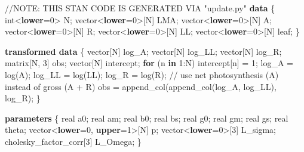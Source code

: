 \documentclass[
  12pt,
  letterpaper,
  DIV=11,
  numbers=noendperiod]{scrartcl}
\newenvironment{Shaded}{\begin{snugshade}}{\end{snugshade}}
\newcommand{\AlertTok}[1]{\textcolor[rgb]{0.68,0.00,0.00}{#1}}
\newcommand{\CommentTok}[1]{\textcolor[rgb]{0.37,0.37,0.37}{#1}}
\newcommand{\ControlFlowTok}[1]{\textcolor[rgb]{0.00,0.23,0.31}{\textbf{#1}}}
\newcommand{\DataTypeTok}[1]{\textcolor[rgb]{0.68,0.00,0.00}{#1}}
\newcommand{\DecValTok}[1]{\textcolor[rgb]{0.68,0.00,0.00}{#1}}
\newcommand{\KeywordTok}[1]{\textcolor[rgb]{0.00,0.23,0.31}{\textbf{#1}}}
\newcommand{\NormalTok}[1]{\textcolor[rgb]{0.00,0.23,0.31}{#1}}
\numberwithin{equation}{section} %
\begin{document}
\begin{Shaded}
\begin{Highlighting}[]
\CommentTok{//}\AlertTok{NOTE}\CommentTok{: THIS STAN CODE IS GENERATED VIA "update.py"}
\KeywordTok{data}\NormalTok{ \{}
  \DataTypeTok{int}\NormalTok{\textless{}}\KeywordTok{lower}\NormalTok{=}\DecValTok{0}\NormalTok{\textgreater{} N;}
  \DataTypeTok{vector}\NormalTok{\textless{}}\KeywordTok{lower}\NormalTok{=}\DecValTok{0}\NormalTok{\textgreater{}[N] LMA;}
  \DataTypeTok{vector}\NormalTok{\textless{}}\KeywordTok{lower}\NormalTok{=}\DecValTok{0}\NormalTok{\textgreater{}[N] A;}
  \DataTypeTok{vector}\NormalTok{\textless{}}\KeywordTok{lower}\NormalTok{=}\DecValTok{0}\NormalTok{\textgreater{}[N] R;}
  \DataTypeTok{vector}\NormalTok{\textless{}}\KeywordTok{lower}\NormalTok{=}\DecValTok{0}\NormalTok{\textgreater{}[N] LL;}
  \DataTypeTok{vector}\NormalTok{\textless{}}\KeywordTok{lower}\NormalTok{=}\DecValTok{0}\NormalTok{\textgreater{}[N] leaf;}
\NormalTok{\}}

\KeywordTok{transformed data}\NormalTok{ \{}
  \DataTypeTok{vector}\NormalTok{[N] log\_A;}
  \DataTypeTok{vector}\NormalTok{[N] log\_LL;}
  \DataTypeTok{vector}\NormalTok{[N] log\_R;}
  \DataTypeTok{matrix}\NormalTok{[N, }\DecValTok{3}\NormalTok{] obs;}
  \DataTypeTok{vector}\NormalTok{[N] intercept;}
  \ControlFlowTok{for}\NormalTok{ (n }\ControlFlowTok{in} \DecValTok{1}\NormalTok{:N)}
\NormalTok{    intercept[n] = }\DecValTok{1}\NormalTok{;}
\NormalTok{  log\_A = log(A);}
\NormalTok{  log\_LL = log(LL);}
\NormalTok{  log\_R = log(R);}
  \CommentTok{// use net photosynthesis (A) instead of gross (A + R)}
\NormalTok{  obs = append\_col(append\_col(log\_A, log\_LL), log\_R);}
\NormalTok{\}}

\KeywordTok{parameters}\NormalTok{ \{}
  \DataTypeTok{real}\NormalTok{ a0;}
  \DataTypeTok{real}\NormalTok{ am;}
  \DataTypeTok{real}\NormalTok{ b0;}
  \DataTypeTok{real}\NormalTok{ bs;}
  \DataTypeTok{real}\NormalTok{ g0;}
  \DataTypeTok{real}\NormalTok{ gm;}
  \DataTypeTok{real}\NormalTok{ gs;}
  \DataTypeTok{real}\NormalTok{ theta;}
  \DataTypeTok{vector}\NormalTok{\textless{}}\KeywordTok{lower}\NormalTok{=}\DecValTok{0}\NormalTok{, }\KeywordTok{upper}\NormalTok{=}\DecValTok{1}\NormalTok{\textgreater{}[N] p;}
  \DataTypeTok{vector}\NormalTok{\textless{}}\KeywordTok{lower}\NormalTok{=}\DecValTok{0}\NormalTok{\textgreater{}[}\DecValTok{3}\NormalTok{] L\_sigma;}
  \DataTypeTok{cholesky\_factor\_corr}\NormalTok{[}\DecValTok{3}\NormalTok{] L\_Omega;}
\NormalTok{\}}


\end{Highlighting}
\end{Shaded}
\end{document}

